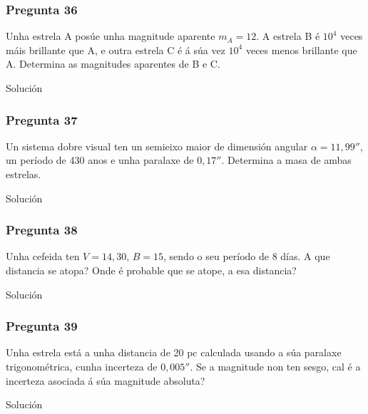 \vspace*{2em}

\begin{Enunciado}
	\subsubsection{Pregunta 36}

	Unha estrela A posúe unha magnitude aparente $m_A = 12$. A estrela B é $10^4$ veces máis brillante que A, e outra estrela C é á súa vez $10^4$ veces menos brillante que A. Determina as magnitudes aparentes de B e C.

\end{Enunciado}
Solución

\vspace*{2em}

\begin{Enunciado}
	\subsubsection{Pregunta 37}

	Un sistema dobre visual ten un semieixo maior de dimensión angular $\alpha = 11{,}99''$, un período de 430 anos e unha paralaxe de $0{,}17''$. Determina a masa de ambas estrelas.

\end{Enunciado}
Solución

\vspace*{2em}

\begin{Enunciado}
	\subsubsection{Pregunta 38}

	Unha cefeida ten $V = 14{,}30$, $B = 15$, sendo o seu período de 8 días. A que distancia se atopa? Onde é probable que se atope, a esa distancia?

\end{Enunciado}
Solución

\vspace*{2em}

\begin{Enunciado}
	\subsubsection{Pregunta 39}

	Unha estrela está a unha distancia de 20 pc calculada usando a súa paralaxe trigonométrica, cunha incerteza de $0{,}005''$. Se a magnitude non ten sesgo, cal é a incerteza asociada á súa magnitude absoluta?

\end{Enunciado}
Solución

